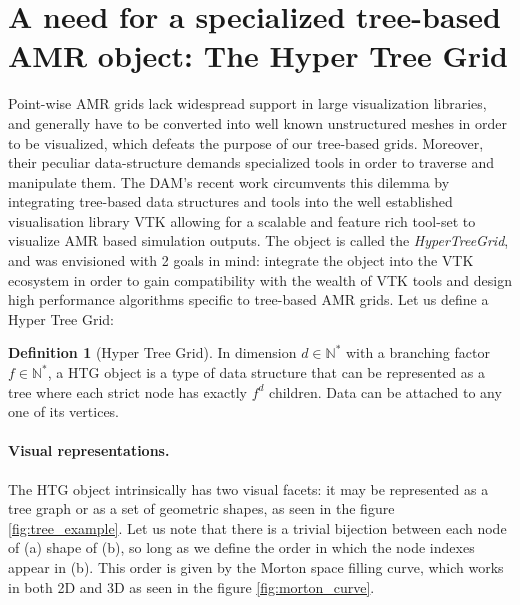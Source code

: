 \documentclass[
	a4paper,
	12pt,
	raggedright,
	twoside
]{tufte-style-article}
\theoremstyle{definition}
\newtheorem{definition}{Definition}[section]
\theoremstyle{remark}
\begin{document}
\section{A need for a specialized tree-based AMR object: The Hyper Tree Grid}

Point-wise \Gls{AMR} grids lack widespread support in large visualization libraries, and generally have to be converted into well known unstructured meshes in order to be visualized, which defeats the purpose of our tree-based grids. Moreover, their peculiar data-structure demands specialized tools in order to traverse and manipulate them. The DAM's recent work circumvents this dilemma by integrating tree-based data structures and tools into the well established visualisation library \Gls{VTK} allowing for a scalable and feature rich tool-set to visualize \Gls{AMR} based simulation outputs. The object is called the \textit{HyperTreeGrid}, and was envisioned with 2 goals in mind: integrate the object into the \Gls{VTK} ecosystem in order to gain compatibility with the wealth of \Gls{VTK} tools and design high performance algorithms specific to tree-based \Gls{AMR} grids.
Let us define a Hyper Tree Grid:

\begin{definition}[Hyper Tree Grid]
In dimension $d \in \mathbb{N^*}$ with a branching factor $f \in \mathbb{N^*}$, a \Gls{HTG} object is a type of data structure that can be represented as a tree where each strict node has exactly $f^d$ children. Data can be attached to any one of its vertices.
\end{definition}

\paragraph{Visual representations.} The \Gls{HTG} object intrinsically has two visual facets: it may be represented as a tree graph or as a set of geometric shapes, as seen in the figure \ref{fig:tree_example}. Let us note that there is a trivial bijection between each node of (a) shape of (b), so long as we define the order in which the node indexes appear in (b). This order is given by the Morton space filling curve, which works in both 2D and 3D as seen in the figure \ref{fig:morton_curve}.
\end{document}
